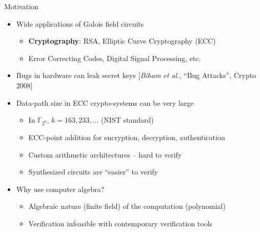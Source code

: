 \documentclass[xcolor=dvipsnames]{beamer}
\newcommand{\bi}{\begin{itemize}}
\newcommand{\ei}{\end{itemize}}
\begin{document}
\begin{frame}{\large {Motivation}}
\vspace{-0.2in}

\begin{itemize}
\item Wide applications of Galois field circuits
	\begin{itemize}
	\item \textbf {Cryptography}: RSA, Elliptic
          Curve Cryptography (ECC) 
	\item Error Correcting Codes, Digital Signal Processing, etc.
	\end{itemize}	
\end{itemize}

\bi
\item Bugs in hardware can leak secret keys [{\it Biham et al.}, ``Bug
  Attacks'', Crypto 2008] 
\ei


 \begin{itemize}
 \item Data-path size in ECC crypto-systems can be very large
 	\begin{itemize}
        \item In $\mathbb{F}_{2^k}$, $k = 163, 233, \dots$ (NIST standard)
        \item ECC-point addition for encryption, decryption, authentication
 	\item Custom arithmetic architectures -- hard to verify
        \item Synthesized circuits are ``easier'' to verify
 	\end{itemize}
 \end{itemize}

\begin{itemize}
\item Why use computer algebra?
	\begin{itemize}
        \item Algebraic nature (finite field) of the computation (polynomial)
	\item  Verification infeasible with contemporary verification tools 
	\end{itemize}
\end{itemize}

\end{frame}
\end{document}
